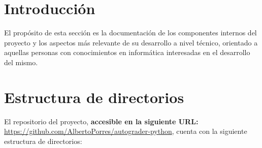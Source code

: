 
\section{Introducción}
El propósito de esta sección es la documentación de los componentes internos del proyecto y los aspectos más relevante de su desarrollo a nivel técnico, orientado a aquellas personas con conocimientos en informática interesadas en el desarrollo del mismo.

\section{Estructura de directorios}
El repositorio del proyecto, \textbf{accesible en la siguiente URL:} \url{https://github.com/AlbertoPorres/autograder-python}, cuenta con la siguiente estructura de directorios:

